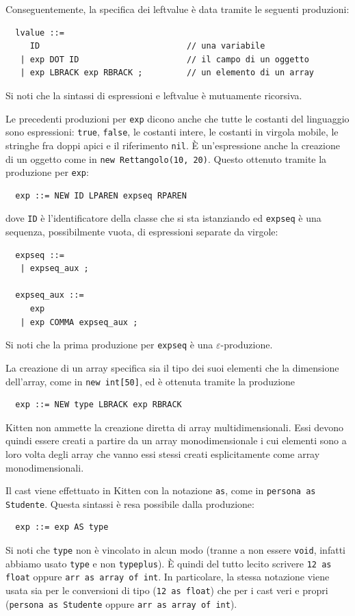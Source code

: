 %
Conseguentemente, la specifica dei leftvalue \`e data tramite le seguenti
produzioni:
%
\begin{verbatim}
  lvalue ::=
     ID                              // una variabile
   | exp DOT ID                      // il campo di un oggetto
   | exp LBRACK exp RBRACK ;         // un elemento di un array
\end{verbatim}
%
Si noti che la sintassi di espressioni e leftvalue \`e mutuamente ricorsiva.

Le precedenti produzioni per \texttt{exp} dicono anche
che tutte le costanti del linguaggio sono espressioni:
\cioe \texttt{true}, \texttt{false}, le costanti intere, le costanti in virgola
mobile, le stringhe fra doppi apici e il riferimento \texttt{nil}.
\`E un'espressione anche la creazione di un oggetto come in
\texttt{new Rettangolo(10, 20)}. Questo \e ottenuto tramite la
produzione per \texttt{exp}:
%
\begin{verbatim}
  exp ::= NEW ID LPAREN expseq RPAREN
\end{verbatim}
%
dove \texttt{ID} \`e l'identificatore della classe che si sta istanziando
ed \texttt{expseq} \`e una sequenza, possibilmente vuota, di espressioni
separate da virgole:
%
\begin{verbatim}
  expseq ::=
   | expseq_aux ;

  expseq_aux ::=
     exp
   | exp COMMA expseq_aux ;
\end{verbatim}
%
Si noti che la prima produzione per \texttt{expseq}
\`e una $\varepsilon$-produzione.

La creazione di un array specifica sia il tipo dei suoi elementi che la
dimensione dell'array, come in \texttt{new int[50]}, ed \`e ottenuta tramite
la produzione
%
\begin{verbatim}
  exp ::= NEW type LBRACK exp RBRACK
\end{verbatim}
%
Kitten non ammette la creazione diretta di array multidimensionali. Essi devono
quindi essere creati a partire da un array monodimensionale i cui elementi
sono a loro volta degli array che vanno essi stessi
creati esplicitamente come array monodimensionali.

Il cast viene effettuato in Kitten con la notazione \texttt{as}, come in
\texttt{persona as Studente}. Questa sintassi \`e resa possibile dalla
produzione:
%
\begin{verbatim}
  exp ::= exp AS type
\end{verbatim}
%
Si noti che \texttt{type} non \`e vincolato in alcun modo (tranne a non essere
\texttt{void}, infatti abbiamo usato \texttt{type} e non \texttt{typeplus}).
\`E quindi del tutto lecito scrivere \texttt{12 as float} oppure
\texttt{arr as array of int}. In particolare, la stessa notazione viene
usata sia per le conversioni di tipo (\texttt{12 as float}) che per
i cast veri e propri (\texttt{persona as Studente} oppure
\texttt{arr as array of int}).

